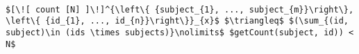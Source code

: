 \lstset{mathescape, language=AST}  
\begin{lstlisting}[frame=single, caption={Count Translation {$\colon$} subject and policyId Pairs},label={lst:transcountSinglePairs}]

$[\![ count [N] ]\!]^{\left\{ {subject_{1}, ..., subject_{m}}\right\}, \left\{ {id_{1}, ..., id_{n}}\right\}}_{x}$ $\triangleq$ $(\sum_{(id, subject)\in (ids \times subjects)}\nolimits$ $getCount(subject, id)) < N$

\end{lstlisting}






